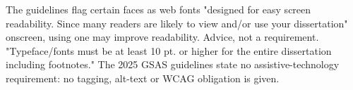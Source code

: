 %
%




	{The guidelines flag certain faces as web fonts "designed for easy screen
	 readability. Since many readers are likely to view and/or use your
	 dissertation" onscreen, using one may improve readability. Advice, not a
	 requirement.}
	{"Typeface/fonts must be at least 10 pt. or higher for the entire
	 dissertation including footnotes."}
	{The 2025 GSAS guidelines state no assistive-technology requirement: no
	 tagging, alt-text or WCAG obligation is given.}

